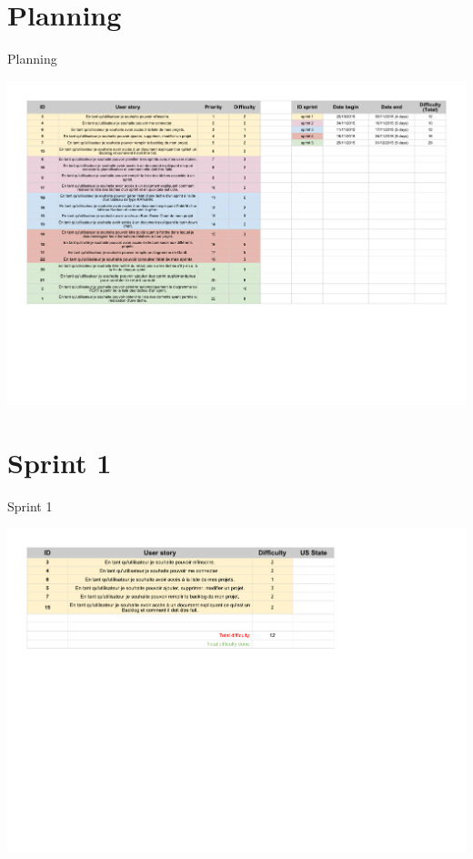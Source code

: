 \documentclass{beamer}
\begin{document}
\section{Planning}

\begin{frame}{Planning}
	\begin{center}
        \includegraphics[scale=0.4]{Planning.pdf}
        \end{center}
\end{frame}

\section{Sprint 1}

\begin{frame}{Sprint 1}
	\begin{center}
        \includegraphics[scale=0.5]{Sprint1.pdf}
        \end{center}
\end{frame}
\end{document}
